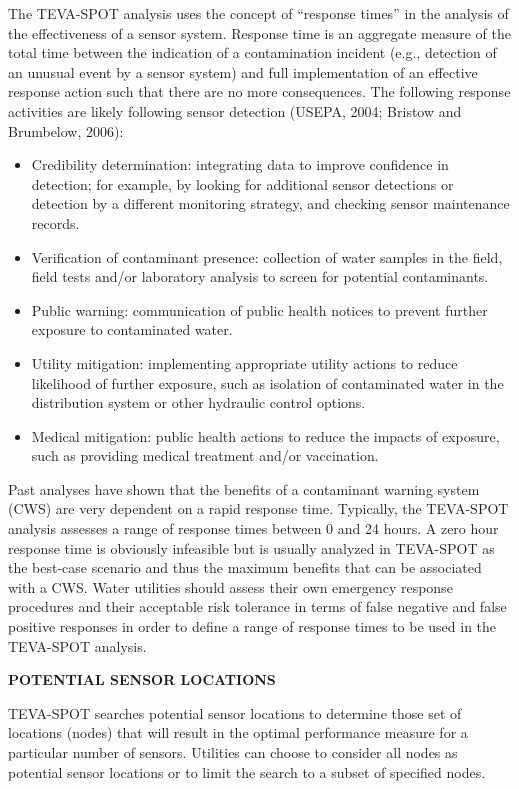 The TEVA-SPOT analysis uses the concept of ``response times'' in the analysis of the effectiveness of a sensor system. Response time is an aggregate measure of the total time between the indication of a contamination incident (e.g., detection of an unusual event by a sensor system) and full implementation of an effective response action such that there are no more consequences. The following response activities are likely following sensor detection (USEPA, 2004; Bristow and Brumbelow, 2006):
\begin{itemize} 
\item Credibility determination: integrating data to improve confidence in detection; for example, by looking for additional sensor detections or detection by a different monitoring strategy, and checking sensor maintenance records.
\item Verification of contaminant presence: collection of water samples in the field, field tests and/or laboratory analysis to screen for potential contaminants.
\item Public warning: communication of public health notices to prevent further exposure to contaminated water.
\item Utility mitigation: implementing appropriate utility actions to reduce likelihood of further exposure, such as isolation of contaminated water in the distribution system or other hydraulic control options.
\item Medical mitigation: public health actions to reduce the impacts of exposure, such as providing medical treatment and/or vaccination.
\end{itemize} 
Past analyses have shown that the benefits of a contaminant warning system (CWS) are very dependent on a rapid response time.   Typically, the TEVA-SPOT analysis assesses a range of response times between 0 and 24 hours. A zero hour response time is obviously infeasible but is usually analyzed in TEVA-SPOT as the best-case scenario and thus the maximum benefits that can be associated with a CWS.  Water utilities should assess their own emergency response procedures and their acceptable risk tolerance in terms of false negative and false positive responses in order to define a range of response times to be used in the TEVA-SPOT analysis.

{\bf POTENTIAL SENSOR LOCATIONS} 

TEVA-SPOT searches potential sensor locations to determine those set of locations (nodes) that will result in the optimal performance measure for a particular number of sensors. Utilities can choose to consider all nodes as potential sensor locations or to limit the search to a subset of specified nodes. 

